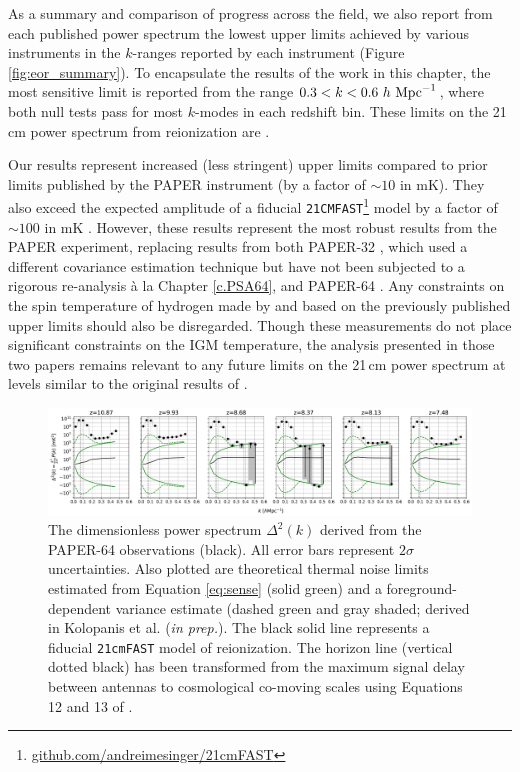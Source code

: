 As a summary and comparison of progress across the field, we also report from each published power spectrum the lowest upper limits achieved by various instruments in the $k$-ranges reported by each instrument (Figure \ref{fig:eor_summary}). To encapsulate the results of the work in this chapter, the most sensitive limit is reported from
the range $0.3 <  k < 0.6\ \hMpci$, where both null tests
pass for most $k$-modes in each redshift bin.
These limits on the 21\,cm power spectrum
from reionization are \upperlims.

Our results represent increased (less stringent) upper limits compared to prior limits published by the PAPER instrument (by a factor of $\sim10$ in mK). They also exceed the expected
amplitude of a fiducial \texttt{21CMFAST}\footnote{\url{github.com/andreimesinger/21cmFAST}}
 model by a factor of $\sim100$ in mK \citep{mesinger_et_al2011}. However, these results represent the
most robust results from the PAPER experiment, replacing results from both PAPER-32 \citep{parsons_et_al2014,jacobs_et_al2015,moore_et_al2017},
which used a different covariance estimation technique
 but have not been subjected to a rigorous re-analysis
\`{a} la Chapter \ref{c.PSA64}, and
PAPER-64 \citep{ali_et_al2015,ali_et_al2018}.
Any constraints on the spin temperature of hydrogen made by
\citet{pober_et_al2015} and \citet{greig_et_al2015a} based on the
previously published upper limits should also be disregarded.
Though these measurements do not place significant constraints on the IGM
temperature, the analysis presented in those two
papers remains relevant to any future limits on the 21\,cm power spectrum 
at levels similar to the original results of .

\begin{figure}[tp]
\centering
\includegraphics[width=\textwidth]{plots/pspec_flagged_ants_delta2.pdf}
\caption{The dimensionless power spectrum $\Delta^{2}(k)$ derived from the PAPER-64 observations (black).
All error bars represent $ 2\sigma $ uncertainties. Also plotted are theoretical thermal noise limits estimated from Equation \eqref{eq:sense} (solid green) and a foreground-dependent variance estimate (dashed green and gray shaded; derived in Kolopanis et al. (\textit{in prep.}).
The black solid line represents a fiducial \texttt{21cmFAST} model of reionization.
The horizon line (vertical dotted black) has been transformed from the maximum
signal delay between antennas to cosmological co-moving scales using Equations 12 and 13  of \citet{liu_et_al2014a}. }
\label{fig:pspec_delta2}
\end{figure}

